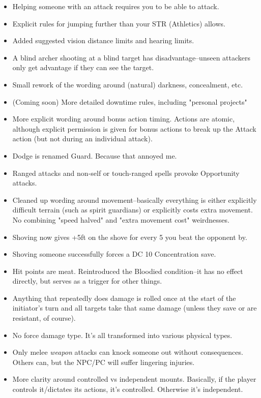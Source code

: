 \begin{itemize}
\begin{itemize}
    \end{itemize}
    \item Helping someone with an attack requires you to be able to attack.
    \item Explicit rules for jumping further than your STR (Athletics) allows.
    \item Added suggested vision distance limits and hearing limits.
    \item A blind archer shooting at a blind target has disadvantage--unseen attackers only get advantage if they can see the target.
    \item Small rework of the wording around (natural) darkness, concealment, etc.
    \item (Coming soon) More detailed downtime rules, including "personal projects"
    \item More explicit wording around bonus action timing. Actions are atomic, although explicit permission is given for bonus actions to break up the Attack action (but not during an individual attack).
    \item Dodge is renamed Guard. Because that annoyed me.
    \item Ranged attacks and non-self or touch-ranged spells provoke Opportunity attacks.
    \item Cleaned up wording around movement--basically everything is either explicitly difficult terrain (such as spirit guardians) or explicitly costs extra movement. No combining "speed halved" and "extra movement cost" weirdnesses.
    \item Shoving now gives +5ft on the shove for every 5 you beat the opponent by.
    \item Shoving someone successfully forces a DC 10 Concentration save.
    \item Hit points are meat. Reintroduced the Bloodied condition--it has no effect directly, but serves as a trigger for other things.
    \item Anything that repeatedly does damage is rolled once at the start of the initiator's turn and all targets take that same damage (unless they save or are resistant, of course).
    \item No force damage type. It's all transformed into various physical types.
    \item Only melee \textit{weapon} attacks can knock someone out without consequences. Others can, but the NPC/PC will suffer lingering injuries.
    \item More clarity around controlled vs independent mounts. Basically, if the player controls it/dictates its actions, it's controlled. Otherwise it's independent.
\end{itemize}
